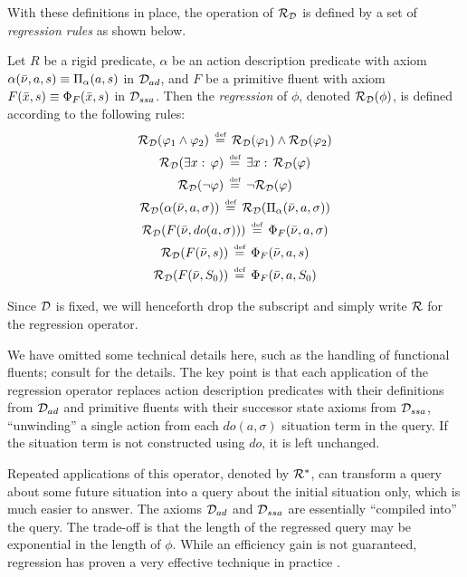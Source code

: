 With these definitions in place, the operation of $\mathcal{R}_{\mathcal{D}}$ is
defined by a set of \emph{regression rules} as shown below.

\begin{defnL}
 Let $R$ be a rigid predicate, $\alpha$
be an action description predicate with axiom $\alpha(\bar{\nu},a,s)\equiv\Pi_{\alpha}(a,s)$
in $\mathcal{D}_{ad}$, and $F$ be a primitive fluent with axiom $F(\bar{x},s)\equiv\Phi_{F}(\bar{x},s)$
in $\mathcal{D}_{ssa}$. Then the \emph{regression} of $\phi$, denoted $\mathcal{R}_{\mathcal{D}}(\phi)$,
is defined according to the following rules:\begin{gather*}
\mathcal{R}_{\mathcal{D}}(\varphi_{1}\wedge\varphi_{2})\,\stackrel{\mbox{\tiny def}}{=}\,\mathcal{R}_{\mathcal{D}}(\varphi_{1})\wedge\mathcal{R}_{\mathcal{D}}(\varphi_{2})\\
\mathcal{R}_{\mathcal{D}}(\exists x:\,\varphi)\,\stackrel{\mbox{\tiny def}}{=}\,\exists x:\,\mathcal{R}_{\mathcal{D}}(\varphi)\\
\mathcal{R}_{\mathcal{D}}(\neg\varphi)\,\stackrel{\mbox{\tiny def}}{=}\,\neg\mathcal{R}_{\mathcal{D}}(\varphi)\\
\mathcal{R}_{\mathcal{D}}(\alpha(\bar{\nu},a,\sigma))\,\stackrel{\mbox{\tiny def}}{=}\,\mathcal{R}_{\mathcal{D}}(\Pi_{\alpha}(\bar{\nu},a,\sigma))\\
\mathcal{R}_{\mathcal{D}}(F(\bar{\nu},do(a,\sigma)))\,\stackrel{\mbox{\tiny def}}{=}\,\Phi_{F}(\bar{\nu},a,\sigma)\\
\mathcal{R}_{\mathcal{D}}(F(\bar{\nu},s))\,\stackrel{\mbox{\tiny def}}{=}\,\Phi_{F}(\bar{\nu},a,s)\\
\mathcal{R}_{\mathcal{D}}(F(\bar{\nu},S_{0}))\,\stackrel{\mbox{\tiny def}}{=}\,\Phi_{F}(\bar{\nu},a,S_{0})\end{gather*}

\end{defnL}
Since $\mathcal{D}$ is fixed, we will henceforth drop the subscript and simply
write $\mathcal{R}$ for the regression operator.

We have omitted some technical details here, such as the handling
of functional fluents; consult \citep{pirri99contributions_sitcalc}
for the details. The key point is that each application of the regression
operator replaces action description predicates with their definitions
from $\mathcal{D}_{ad}$ and primitive fluents with their successor state
axioms from $\mathcal{D}_{ssa}$, {}``unwinding'' a single action from each
$do(a,\sigma)$ situation term in the query. If the situation term
is not constructed using $do$, it is left unchanged.

Repeated applications of this operator, denoted by $\mathcal{R}^{*}$, can
transform a query about some future situation into a query about the
initial situation only, which is much easier to answer. The axioms
$\mathcal{D}_{ad}$ and $\mathcal{D}_{ssa}$ are essentially {}``compiled into''
the query. The trade-off is that the length of the regressed query
may be exponential in the length of $\phi$. While an efficiency gain
is not guaranteed, regression has proven a very effective technique
in practice \citep{levesque97golog,pirri99contributions_sitcalc}.

